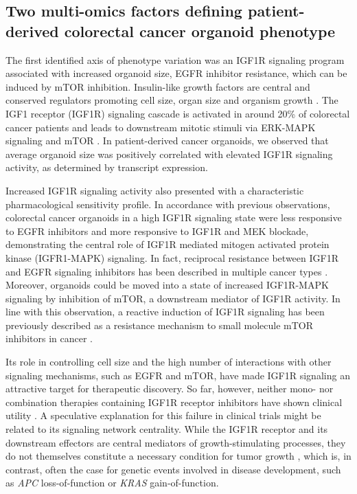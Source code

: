 \begin{flushleft}
\subsection{Two multi-omics factors defining patient-derived colorectal cancer organoid phenotype}

The first identified axis of phenotype variation was an IGF1R signaling program associated with increased organoid size, EGFR inhibitor resistance, which can be induced by mTOR inhibition. Insulin-like growth factors are central and conserved regulators promoting cell size, organ size and organism growth \parencite{pucheHumanConditionsInsulinlike2012, sunMechanismCellSize2006}. The IGF1 receptor (IGF1R) signaling cascade is activated in around 20\% of colorectal cancer patients and leads to downstream mitotic stimuli via ERK-MAPK signaling and mTOR \parencite{zhongOverproductionIGF2Drives2017}. In patient-derived cancer organoids, we observed that average organoid size was positively correlated with elevated IGF1R signaling activity, as determined by transcript expression.
\smallbreak

Increased IGF1R signaling activity also presented with a characteristic pharmacological sensitivity profile. In accordance with previous observations\parencite{isellaSelectiveAnalysisCancercell2017}, colorectal cancer organoids in a high IGF1R signaling state were less responsive to EGFR inhibitors and more responsive to IGF1R and MEK blockade, demonstrating the central role of IGF1R mediated mitogen activated protein kinase (IGFR1-MAPK) signaling. In fact, reciprocal resistance between IGF1R and EGFR signaling inhibitors has been described in multiple cancer types \parencite{huaInsulinlikeGrowthFactor2020a}. Moreover, organoids could be moved into a state of increased IGF1R-MAPK signaling by inhibition of mTOR, a downstream mediator of IGF1R activity. In line with this observation, a reactive induction of IGF1R signaling has been previously described as a resistance mechanism to small molecule mTOR inhibitors in cancer \parencite{sharmaChromatinmediatedReversibleDrugtolerant2010, yoonFocalAdhesionIGF1RDependent2017a}. 
\smallbreak

Its role in controlling cell size and the high number of interactions with other signaling mechanisms, such as EGFR and mTOR, have made IGF1R signaling an attractive target for therapeutic discovery. So far, however, neither mono- nor combination therapies containing IGF1R receptor inhibitors have shown clinical utility \parencite{beckwithMinireviewWereIGF2015, jentzschCostsCausesOncology2023}. A speculative explanation for this failure in clinical trials might be related to its signaling network centrality. While the IGF1R receptor and its downstream effectors are central mediators of growth-stimulating processes, they do not themselves constitute a necessary condition for tumor growth \parencite{beckwithMinireviewWereIGF2015}, which is, in contrast, often the case for genetic events involved in disease development, such as \textit{APC} loss-of-function \parencite{dowApcRestorationPromotes2015a} or \textit{KRAS} gain-of-function. 
\smallbreak


\end{flushleft}

